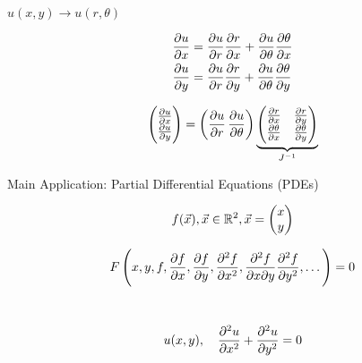 \documentclass[twoside]{scrartcl}
\begin{document}
\begin{example}
	$u(x,y) \longrightarrow u(r,\theta)$
	
	\[
\begin{aligned}
  \frac{\partial u}{\partial x} &= \frac{\partial u}{\partial r}\frac{\partial r}{\partial x} + \frac{\partial u}{\partial \theta} \frac{\partial \theta}{\partial x}\\
  \frac{\partial u}{\partial y} &= \frac{\partial u}{\partial r}\frac{\partial r}{\partial y} + \frac{\partial u}{\partial \theta} \frac{\partial \theta}{\partial y}
\end{aligned}
\]

\[\begin{pmatrix}
\frac{\partial u}{\partial x}\\ \frac{\partial u}{\partial y}
\end{pmatrix}
= \left( \frac{\partial u}{\partial r}\, \frac{\partial u}{\partial \theta}\right)
\underbrace{\begin{pmatrix}
\frac{\partial r}{\partial x} & \frac{\partial r}{\partial y}\\
\frac{\partial \theta}{\partial x} & \frac{\partial \theta}{\partial y}	
\end{pmatrix}}_{J^{-1}}
\]
\end{example}


Main Application: 
Partial Differential Equations (PDEs)

\[f(\vec{x}), \vec{x} \in\mathbb{R}^2, \vec{x} = \begin{pmatrix}
 x \\ y	
 \end{pmatrix}
\]

\[F\left(x,y,f,\frac{\partial f}{\partial x}, \frac{\partial f}{\partial y}, \frac{\partial^2f}{\partial x^2}, \frac{\partial^2f}{\partial x\partial y}\frac{\partial^2f}{\partial y^2},\dots\right) = 0\]~


\[u(x,y),\quad \frac{\partial^2u}{\partial x^2} + \frac{\partial^2u}{\partial y^2} = 0\]
\end{document}
